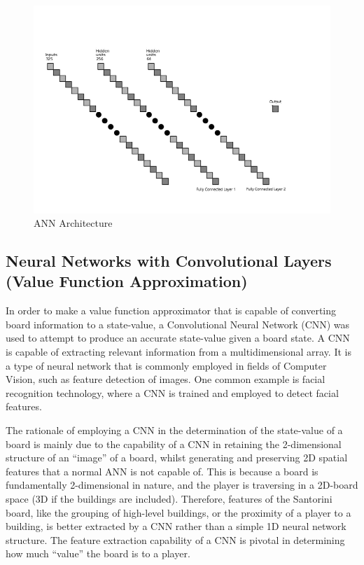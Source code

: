 \documentclass[a4paper,12pt,table]{article}
\begin{document}
\begin{figure}[H]
    \begin{center}
        \includegraphics[scale=0.65]{ANN_Architecture.jpg}
        \caption{ANN Architecture}
        \label{fig:}
    \end{center}
\end{figure}


\subsection{Neural Networks with Convolutional Layers (Value Function Approximation)}

In order to make a value function approximator that is capable of converting board information to a state-value, a Convolutional Neural Network (CNN) was used to attempt to produce an accurate state-value given a board state. A CNN is capable of extracting relevant information from a multidimensional array.  It is a type of neural network that is commonly employed in fields of Computer Vision, such as feature detection of images. One common example is facial recognition technology, where a CNN is trained and employed to detect facial features.   \par

The rationale of employing a CNN in the determination of the state-value of a board is mainly due to the capability of a CNN in retaining the 2-dimensional structure of an “image” of a board, whilst generating and preserving 2D spatial features that a normal ANN is not capable of. This is because a board is fundamentally 2-dimensional in nature, and the player is traversing in a 2D-board space (3D if the buildings are included). Therefore, features of the Santorini board, like the grouping of high-level buildings, or the proximity of a player to a building, is better extracted by a CNN rather than a simple 1D neural network structure. The feature extraction capability of a CNN is pivotal in determining how much “value” the board is to a player. \par
\end{document}
